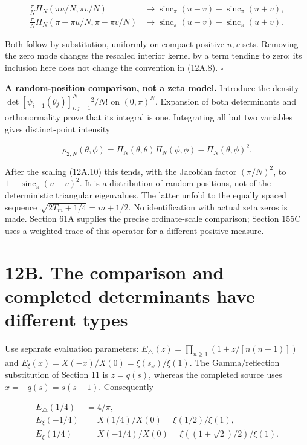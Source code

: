 \documentclass[
  11pt,
]{book}
\begin{document}
\[
\begin{aligned}
\frac\pi N\Pi_N(\pi u/N,\pi v/N)
 &\longrightarrow\operatorname{sinc}_\pi(u-v)-\operatorname{sinc}_\pi(u+v),\\
\frac\pi N\Pi_N(\pi-\pi u/N,\pi-\pi v/N)
 &\longrightarrow\operatorname{sinc}_\pi(u-v)+\operatorname{sinc}_\pi(u+v).
\end{aligned}
\tag{12A.11}
\]

Both follow by substitution, uniformly on compact positive \(u,v\) sets.
Removing the zero mode changes the rescaled interior kernel by a term
tending to zero; its inclusion here does not change the convention in
(12A.8). \(\square\)

\textbf{A random-position comparison, not a zeta model.} Introduce the
density \(\det[\psi_{i-1}(\theta_j)]_{i,j=1}^N{}^2/N!\) on
\((0,\pi)^N\). Expansion of both determinants and orthonormality prove
that its integral is one. Integrating all but two variables gives
distinct-point intensity

\[
\rho_{2,N}(\theta,\phi)=\Pi_N(\theta,\theta)\Pi_N(\phi,\phi)
-\Pi_N(\theta,\phi)^2.
\tag{12A.12}
\]

After the scaling (12A.10) this tends, with the Jacobian factor
\((\pi/N)^2\), to \(1-\operatorname{sinc}_\pi(u-v)^2\). It is a
distribution of random positions, not of the deterministic triangular
eigenvalues. The latter unfold to the equally spaced sequence
\(\sqrt{2T_m+1/4}=m+1/2\). No identification with actual zeta zeros is
made. Section 61A supplies the precise ordinate-scale comparison;
Section 155C uses a weighted trace of this operator for a different
positive measure.

\section{12B. The comparison and completed determinants have different
types}\label{b.-the-comparison-and-completed-determinants-have-different-types}

Use separate evaluation parameters:
\(E_\triangle(z)=\prod_{n\ge1}(1+z/[n(n+1)])\) and
\(E_\xi(x)=X(-x)/X(0)=\xi(s_x)/\xi(1)\). The Gamma/reflection
substitution of Section 11 is \(z=q(s)\), whereas the completed source
uses \(x=-q(s)=s(s-1)\). Consequently

\[
\begin{aligned}
E_\triangle(1/4)&=4/\pi,\\
E_\xi(-1/4)&=X(1/4)/X(0)=\xi(1/2)/\xi(1),\\
E_\xi(1/4)&=X(-1/4)/X(0)
 =\xi((1+\sqrt2)/2)/\xi(1).
\end{aligned}
\tag{12B.1}
\]
\end{document}
